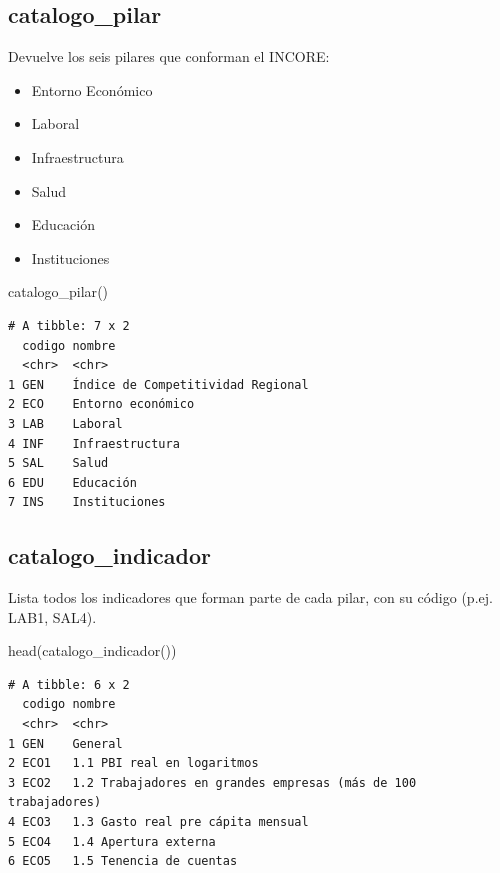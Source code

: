 \documentclass[
  11pt,
  letterpaper,
  DIV=11,
  numbers=noendperiod]{scrartcl}
\newenvironment{Shaded}{\begin{snugshade}}{\end{snugshade}}
\newcommand{\FunctionTok}[1]{\textcolor[rgb]{0.28,0.35,0.67}{#1}}
\newcommand{\NormalTok}[1]{\textcolor[rgb]{0.00,0.23,0.31}{#1}}
\begin{document}
\subsection{catalogo\_pilar}\label{catalogo_pilar}

Devuelve los seis pilares que conforman el INCORE:

\begin{itemize}
\item
  Entorno Económico
\item
  Laboral
\item
  Infraestructura
\item
  Salud
\item
  Educación
\item
  Instituciones
\end{itemize}

\begin{Shaded}
\begin{Highlighting}[]
\FunctionTok{catalogo\_pilar}\NormalTok{()}
\end{Highlighting}
\end{Shaded}

\begin{verbatim}
# A tibble: 7 x 2
  codigo nombre                           
  <chr>  <chr>                            
1 GEN    Índice de Competitividad Regional
2 ECO    Entorno económico                
3 LAB    Laboral                          
4 INF    Infraestructura                  
5 SAL    Salud                            
6 EDU    Educación                        
7 INS    Instituciones                    
\end{verbatim}

\subsection{catalogo\_indicador}\label{catalogo_indicador}

Lista todos los indicadores que forman parte de cada pilar, con su
código (p.ej. LAB1, SAL4).

\begin{Shaded}
\begin{Highlighting}[]
\FunctionTok{head}\NormalTok{(}\FunctionTok{catalogo\_indicador}\NormalTok{())}
\end{Highlighting}
\end{Shaded}

\begin{verbatim}
# A tibble: 6 x 2
  codigo nombre                                                        
  <chr>  <chr>                                                         
1 GEN    General                                                       
2 ECO1   1.1 PBI real en logaritmos                                    
3 ECO2   1.2 Trabajadores en grandes empresas (más de 100 trabajadores)
4 ECO3   1.3 Gasto real pre cápita mensual                             
5 ECO4   1.4 Apertura externa                                          
6 ECO5   1.5 Tenencia de cuentas                                       
\end{verbatim}
\end{document}
